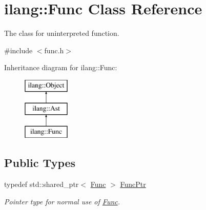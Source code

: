 \hypertarget{classilang_1_1_func}{}\section{ilang\+:\+:Func Class Reference}
\label{classilang_1_1_func}


The class for uninterpreted function.  




{\ttfamily \#include $<$func.\+h$>$}

Inheritance diagram for ilang\+:\+:Func\+:\begin{figure}[H]
\begin{center}
\leavevmode
\includegraphics[height=3.000000cm]{classilang_1_1_func}
\end{center}
\end{figure}
\subsection*{Public Types}
\begin{DoxyCompactItemize}
\item 
\mbox{\label{classilang_1_1_func_a91aa192ceb8b9025423fdb95c8429282}} 
typedef std\+::shared\+\_\+ptr$<$ \mbox{\hyperlink{classilang_1_1_func}{Func}} $>$ \mbox{\hyperlink{classilang_1_1_func_a91aa192ceb8b9025423fdb95c8429282}{Func\+Ptr}}
\begin{DoxyCompactList}\small\item\em Pointer type for normal use of \mbox{\hyperlink{classilang_1_1_func}{Func}}. \end{DoxyCompactList}\end{DoxyCompactItemize}
